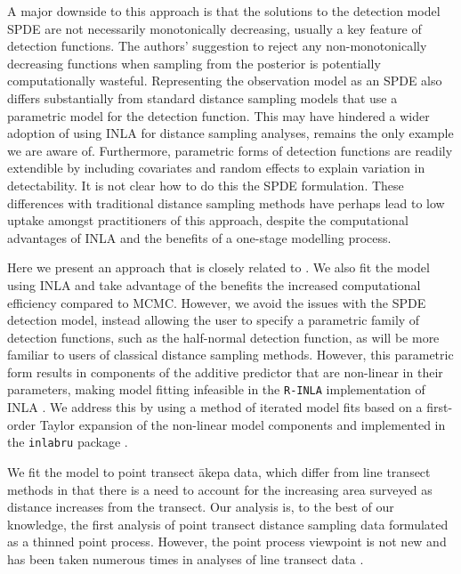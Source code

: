 \documentclass{stylefile16/statsoc}
\newcommand{\akepa}{\textquotesingle\={a}kepa}  %
\begin{document}
A major downside to this approach is that the solutions to the detection model SPDE are not necessarily monotonically decreasing, usually a key feature of detection functions.  The authors' suggestion to reject any non-monotonically decreasing functions when sampling from the posterior is potentially computationally wasteful. Representing the observation model as an SPDE also differs substantially from standard distance sampling models that use a parametric model for the detection function.  This may have hindered a wider adoption of using INLA for distance sampling analyses, \cite{yuan_point_2017} remains the only example we are aware of.  Furthermore, parametric forms of detection functions are readily extendible by including covariates and random effects to explain variation in detectability.  It is not clear how to do this the SPDE formulation.  These differences with traditional distance sampling methods have perhaps lead to low uptake amongst practitioners of this approach, despite the computational advantages of INLA and the benefits of a one-stage modelling process.  

Here we present an approach that is closely related to \citet{yuan_point_2017}.  We also fit the model using INLA and take advantage of the benefits the increased computational efficiency compared to MCMC.  However, we avoid the issues with the SPDE detection model, instead allowing the user to specify a parametric family of detection functions, such as the half-normal detection function, as will be more familiar to users of classical distance sampling methods. However, this parametric form results in components of the additive predictor that are non-linear in their parameters, making model fitting infeasible in the \texttt{R-INLA} implementation of INLA \citep{rue_approximate_2009}.  We address this by using a method of iterated model fits based on a first-order Taylor expansion of the non-linear model components and implemented in the \texttt{inlabru} package \citep{bachl_inlabru_2019}.

We fit the model to point transect \akepa{} data, which differ from line transect methods in that there is a need to account for the increasing area surveyed as distance increases from the transect.  Our analysis is, to the best of our knowledge, the first analysis of point transect distance sampling data formulated as a thinned point process.  However, the point process viewpoint is not new and has been taken numerous times in analyses of line transect data \citep{buckland_model-based_2016, niemi_bayesian_2010, johnson_model-based_2010, waagepetersen_likelihood-based_2006, hedley_spatial_2004,  hogmander_random_1991, stoyan_remark_1982}.
\end{document}
